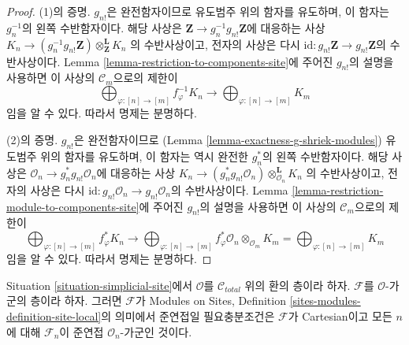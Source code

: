 \begin{proof}
(1)의 증명. $g_{n!}$은 완전함자이므로 유도범주 위의 함자를 유도하며,
이 함자는 $g_n^{-1}$의 왼쪽 수반함자이다.
해당 사상은
$\mathbf{Z} \to g_n^{-1}g_{n!}\mathbf{Z}$에 대응하는 사상
$K_n \to (g_n^{-1}g_{n!}\mathbf{Z}) \otimes^\mathbf{L}_\mathbf{Z} K_n$
의 수반사상이고, 전자의 사상은 다시
$\text{id} : g_{n!}\mathbf{Z} \to g_{n!}\mathbf{Z}$의 수반사상이다.
Lemma \ref{lemma-restriction-to-components-site}에 주어진
$g_{n!}$의 설명을 사용하면 이 사상의 $\mathcal{C}_m$으로의 제한이
$$
\bigoplus\nolimits_{\varphi : [n] \to [m]} f_\varphi^{-1}K_n
\longrightarrow
\bigoplus\nolimits_{\varphi : [n] \to [m]} K_m
$$
임을 알 수 있다. 따라서 명제는 분명하다.

\medskip\noindent
(2)의 증명. $g_{n!}$은 완전함자이므로
(Lemma \ref{lemma-exactness-g-shriek-modules})
유도범주 위의 함자를 유도하며, 이 함자는 역시 완전한 $g_n^*$의
왼쪽 수반함자이다. 해당 사상은
$\mathcal{O}_n \to g_n^*g_{n!}\mathcal{O}_n$에 대응하는 사상
$K_n \to (g_n^*g_{n!}\mathcal{O}_n)
\otimes^\mathbf{L}_{\mathcal{O}_n} K_n$
의 수반사상이고, 전자의 사상은 다시
$\text{id} : g_{n!}\mathcal{O}_n \to g_{n!}\mathcal{O}_n$의
수반사상이다. Lemma
\ref{lemma-restriction-module-to-components-site}에 주어진
$g_{n!}$의 설명을 사용하면 이 사상의 $\mathcal{C}_m$으로의 제한이
$$
\bigoplus\nolimits_{\varphi : [n] \to [m]} f_\varphi^*K_n
\longrightarrow
\bigoplus\nolimits_{\varphi : [n] \to [m]}
f_\varphi^*\mathcal{O}_n \otimes_{\mathcal{O}_m} K_m =
\bigoplus\nolimits_{\varphi : [n] \to [m]} K_m
$$
임을 알 수 있다. 따라서 명제는 분명하다.
\end{proof}

\begin{lemma}
\label{lemma-quasi-coherent-sheaf}
Situation \ref{situation-simplicial-site}에서
$\mathcal{O}$를 $\mathcal{C}_{total}$ 위의 환의 층이라 하자.
$\mathcal{F}$를 $\mathcal{O}$-가군의 층이라 하자.
그러면 $\mathcal{F}$가 Modules on Sites, Definition
\ref{sites-modules-definition-site-local}의 의미에서 준연접일 필요충분조건은
$\mathcal{F}$가 Cartesian이고 모든 $n$에 대해
$\mathcal{F}_n$이 준연접 $\mathcal{O}_n$-가군인 것이다.
\end{lemma}

